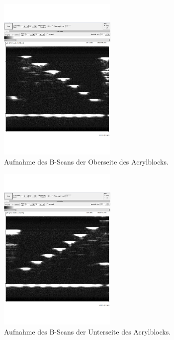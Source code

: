 \begin{figure}[H]
    \centering
    \includegraphics[height=8cm]{content/pics/B-Scan_1.pdf}
    \caption{Aufnahme des B-Scans der Oberseite des Acrylblocks.}
    \label{fig:B-Scan oben}
  \end{figure}

  \begin{figure}[H]
    \centering
    \includegraphics[height=8cm]{content/pics/B-Scan_2.pdf}
    \caption{Aufnahme des B-Scans der Unterseite des Acrylblocks.}
    \label{fig:B-Scan unten}
  \end{figure}

